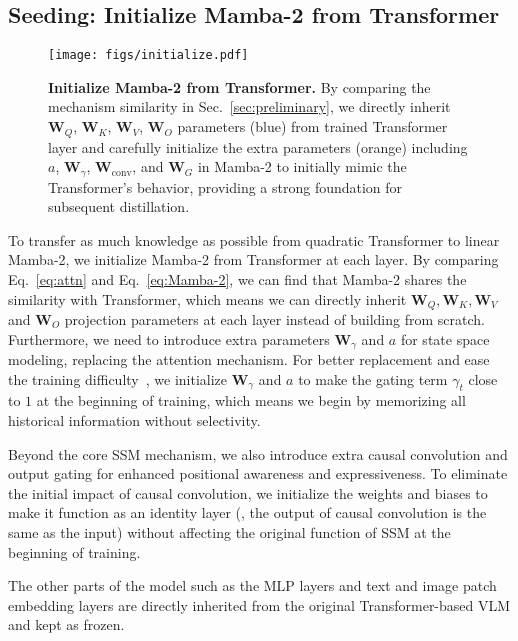 \subsection{Seeding: Initialize Mamba-2 from Transformer}
\label{sec:init}
\begin{figure}
    \centering
    \texttt{[image: figs/initialize.pdf]}
    \caption{
        \textbf{Initialize Mamba-2 from Transformer.} By comparing the mechanism similarity in Sec.~\ref{sec:preliminary}, we directly inherit $\boldsymbol{W}_Q$, $\boldsymbol{W}_K$, $\boldsymbol{W}_V$, $\boldsymbol{W}_O$ parameters (blue) from trained Transformer layer and carefully initialize the extra parameters (orange) including $a$, $\boldsymbol{W}_\gamma$, $\boldsymbol{W}_{\text{conv}}$, and $\boldsymbol{W}_G$ in Mamba-2 to initially mimic the Transformer's behavior, providing a strong foundation for subsequent distillation.
    }
    \vspace{-0.3cm}
    \label{fig:Mamba-2_from_transformer}
\end{figure}

To transfer as much knowledge as possible from quadratic Transformer to linear Mamba-2, we initialize Mamba-2 from Transformer at each layer.
By comparing Eq.~\ref{eq:attn} and Eq.~\ref{eq:Mamba-2}, we can find that Mamba-2 shares the similarity with Transformer, which means we can directly inherit $\boldsymbol{W}_Q, \boldsymbol{W}_K, \boldsymbol{W}_V$ and $\boldsymbol{W}_O$ projection parameters at each layer instead of building from scratch. 
Furthermore, we need to introduce extra parameters $\boldsymbol{W}_\gamma$ and $a$ for state space modeling, replacing the attention mechanism.
For better replacement and ease the training difficulty~\cite{trockman2024mimetic}, we initialize $\boldsymbol{W}_\gamma$ and $a$ to make the gating term $\gamma_t$ close to $1$ at the beginning of training, which means we begin by memorizing all historical information without selectivity.

Beyond the core SSM mechanism, we also introduce extra causal convolution and output gating for enhanced positional awareness and expressiveness.
To eliminate the initial impact of causal convolution, we initialize the weights and biases to make it function as an identity layer (\ie, the output of causal convolution is the same as the input) without affecting the original function of SSM at the beginning of training.

The other parts of the model such as the MLP layers and text and image patch embedding layers are directly inherited from the original Transformer-based VLM and kept as frozen.

